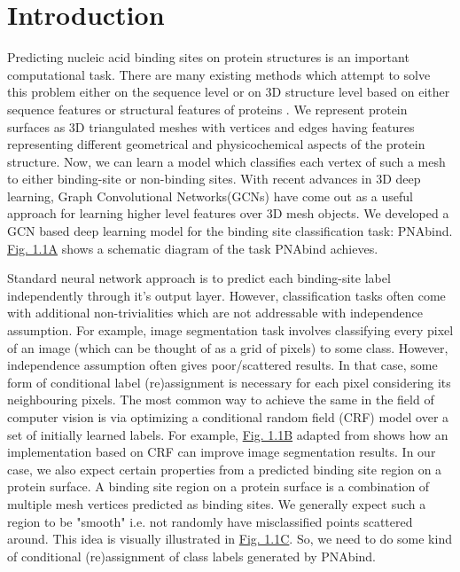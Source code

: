 \section{Introduction} Predicting nucleic acid binding sites on protein structures is an important computational task.  There are many existing methods which attempt to solve this problem either on the sequence level or on 3D structure level based on either sequence features or structural features of proteins \citep{deng2018pdrlgb, wang2010bindn+, wang2006bindn, li2013predna}.
We represent protein surfaces as 3D triangulated meshes with 
vertices and edges having features representing different geometrical and physicochemical aspects of the protein structure. Now, we can learn a model which classifies each vertex of such a mesh to either binding-site or
non-binding sites. With recent advances in 3D deep learning, Graph Convolutional
Networks(GCNs) have come out as a useful approach for learning higher level features over
3D mesh objects. We developed a GCN based deep learning model for the binding site classification
task: PNAbind. \hyperref[fig:crf_concept]{Fig. 1.1A} shows a schematic diagram of
the task PNAbind achieves.

Standard neural network approach is to predict each binding-site label independently
through it's output layer. However, classification tasks often come with additional non-trivialities which
are not addressable with independence assumption.  For example, image segmentation task involves
classifying every pixel of an image (which can be thought of as a grid of pixels) to some class.
However, independence assumption often gives poor/scattered results. In that case, some form of
conditional label (re)assignment is necessary for each pixel considering its neighbouring pixels. The
most common way to achieve the same in the field of computer vision is via optimizing a conditional
random  field (CRF) model over a set of initially  learned labels. For example,
\hyperref[fig:crf_concept]{Fig. 1.1B} adapted
from \citet{krahenbuhl2012efficient}  shows how an implementation based on CRF can improve image
segmentation results. In our case, we also expect certain properties from a predicted binding site
region on a protein surface. A binding site region on a protein surface is a combination
of multiple mesh vertices predicted as binding sites. We generally expect such a region to be
"smooth" i.e. not randomly have misclassified points scattered around. This idea is visually illustrated in
\hyperref[fig:crf_concept]{Fig. 1.1C}. So, we need to do some kind
of conditional (re)assignment of class labels generated by PNAbind.

